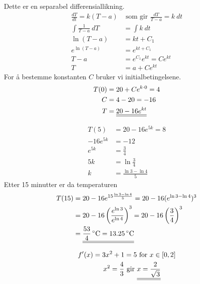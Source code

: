 \documentclass[a4paper,norsk,12pt]{article}
\begin{document}
Dette er en separabel differensiallikning.
\begin{align*}
  \frac{dT}{dt}  = k(T-a) & \text{ som gir }
  \frac{dT}{T-a}  = k~dt \\
  \int{\frac{1}{T-a}~dT} & = \int{ k~dt } \\
  \ln{(T-a)} & = kt + C_1 \\
  e^{\ln{(T-a)}} & = e^{kt + C_1} \\
  T-a & = e^{C_1} e^{kt} = Ce^{kt} \\
  T & = a + Ce^{kt}
\end{align*}
For å bestemme konstanten $C$ bruker vi initialbetingelsene.
\begin{align*}
  T(0) &= 20 + Ce^{k\cdot0} = 4 \\
  C &= 4 - 20 = -16 \\
  T &= {\underline{\underline{20 - 16e^{kt}}}}
\end{align*}

\begin{align*}
  T(5) & = 20-16e^{5k} = 8 \\
  -16e^{5k} & = -12 \\
  e^{5k} & = \frac{3}{4} \\
  5k & = \ln\frac{3}{4} \\
  k & = \frac{\ln 3 - \ln 4}{5}
\end{align*}
Etter 15 minutter er da temperaturen
\begin{align*}
  T(15) & = 20 - 16e^{15\frac{\ln 3 - \ln 4}{5}}
          = 20 - 16(e^{\ln 3 - \ln 4})^3 \\
        & = 20 - 16\left( \frac{e^{\ln 3}}{e^{\ln 4}} \right)^3
          = 20 - 16\left(\frac{3}{4}\right)^3 \\
        & = \svar{\unit[\frac{53}{4}]{^\circ C} = \unit[13.25]{^\circ C}}
\end{align*}


\begin{align*}
  f'(x) = 3x^2 + 1 & = 5 \text{ for } x \in [0,2]\\
  x^2 = \frac{4}{3} & \text{ gir }
  \svar{x = \frac{2}{\sqrt{3}}}
\end{align*}
\end{document}
